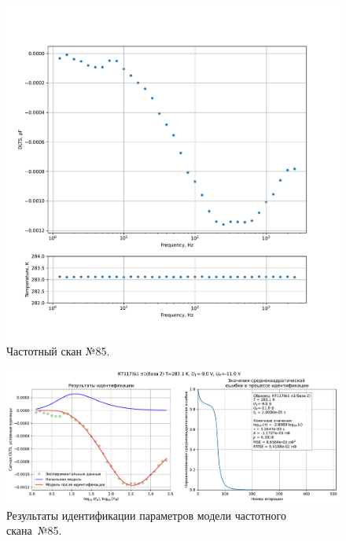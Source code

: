 \begin{figure}[!ht]
    \centering
    \includegraphics[width=1\textwidth]{../plots/КТ117№1_п1(база 2)_2500Гц-1Гц_1пФ_+10С_-9В-11В_50мВ_20мкс_шаг_0,1.pdf}
    \caption{Частотный скан №85.}
    \label{pic:frequency_scan_85}
\end{figure}

\begin{figure}[!ht]
    \centering
    \includegraphics[width=1\textwidth]{../plots/КТ117№1_п1(база 2)_2500Гц-1Гц_1пФ_+10С_-9В-11В_50мВ_20мкс_шаг_0,1_model.pdf}
    \caption{Результаты идентификации параметров модели частотного скана~№85.}
    \label{pic:frequency_scan_model85}
\end{figure}

\pagebreak



